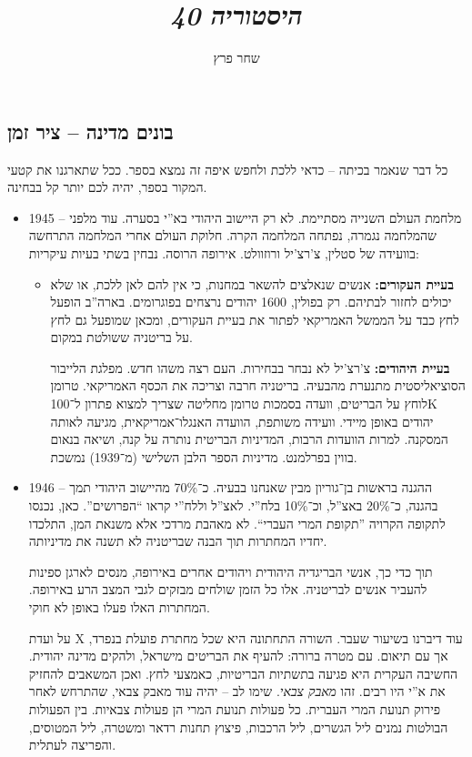 \documentclass[]{../../../../tex/classes/styledArticle}
\author{שחר פרץ}
\title{\textit{היסטוריה 40}}
\begin{document}
	\maketitle
	
	\subsection{בונים מדינה – ציר זמן}
	כל דבר שנאמר בכיתה – כדאי ללכת ולחפש איפה זה נמצא בספר. ככל שתארגנו את קטעי המקור בספר, יהיה לכם יותר קל בבחינה. 
	
	\begin{itemize}
		\item 1945 -- מלחמת העולם השנייה מסתיימת. לא רק היישוב היהודי בא''י בסערה. עוד מלפני שהמלחמה נגמרה, נפתחה המלחמה הקרה. חלוקת העולם אחרי המלחמה התרחשה בוועידה של סטלין, צ'רצ'יל ורוזוולט. אירופה הרוסה. נבחין בשתי בעיות עיקריות: 
		\begin{itemize}
			\item \textbf{בעיית העקורים: }אנשים שנאלצים להשאר במחנות, כי אין להם לאן ללכת, או שלא יכולים לחזור לבתיהם. רק בפולין, 1600 יהודים נרצחים בפוגרומים. בארה''ב הופעל לחץ כבד על הממשל האמריקאי לפתור את בעיית העקורים, ומכאן שמופעל גם לחץ על בריטניה ששולטת במקום. 
			
			\textbf{בעיית היהודים: }צ'רצ'יל לא נבחר בבחירות. העם רצה משהו חדש. מפלגת הלייבור הסוציאליסטית מתנערת מהבעיה. בריטניה חרבה וצריכה את הכסף האמריקאי. טרומן לוחץ על הבריטים, וועדה בסמכות טרומן מחליטה שצריך למצוא פתרון ל־100K יהודים באופן מיידי. וועידה משותפת, הוועדה האנגלו־אמריקאית, מגיעה לאותה המסקנה. למרות הוועדות הרבות, המדיניות הבריטית נותרה על קנה, ושיאה בנאום בווין בפרלמנט. מדיניות הספר הלבן השלישי (מ־1939) נמשכת. 
		\end{itemize}
		\item 1946 -- ההגנה בראשות בן־גוריון מבין שאנחנו בבעיה. כ־70\% מהיישוב היהודי תמך בהגנה, כ־20\% באצ''ל, וכ־10\% בלח''י. לאצ''ל וללח''י קראו ``הפרושים''. כאן, נכנסו לתקופה הקרויה ''תקופת המרי העברי``. לא מאהבת מרדכי אלא משנאת המן, התלכדו יחדיו המחתרות תוך הבנה שבריטניה לא תשנה את מדיניותה. 
		
		תוך כדי כך, אנשי הבריגדיה היהודית ויהודים אחרים באירופה, מנסים לארגן ספינות להעביר אנשים לבריטניה. אלו כל הזמן שולחים מבזקים לגבי המצב הרע באירופה. המחתרות האלו פעלו באופן לא חוקי. 
		
		על ועדת X עוד דיברנו בשיעור שעבר. השורה התחתונה היא שכל מחתרת פועלת בנפרד, אך עם תיאום. עם מטרה ברורה: להעיף את הבריטים מישראל, ולהקים מדינה יהודית. החשיבה העקרית היא פגיעה בתשתיות הבריטיות, כאמצעי לחץ. ואכן המשאבים להחזיק את א''י היו רבים. זהו \textit{מאבק צבאי}. שימו לב – יהיה עוד מאבק צבאי, שהתרחש לאחר פירוק תנועת המרי העברית. כל פעולות תנועת המרי הן פעולות צבאיות. בין הפעולות הבולטות נמנים ליל הגשרים, ליל הרכבות, פיצוץ תחנות רדאר ומשטרה, ליל המטוסים, והפריצה לעתלית. 
		

\end{itemize}
\end{document}
